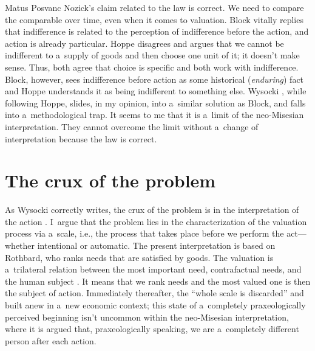 \begin{artengenv}{Matus Posvanc}
Nozick's claim related to the law is correct. We need to compare the comparable over time, even when it comes to valuation. Block 
\parencites*[][]{Block1980On}[][]{Block2009Rejoinder} %
 vitally replies that indifference is related to the perception of indifference before the action, and action is already particular. Hoppe 
\parencite*[][]{Hoppe2005Must} %
 disagrees and argues that we cannot be indifferent to a~supply of goods and then choose one unit of it; it doesn't make sense. Thus, both agree that choice is specific and both work with indifference. Block, however, sees indifference before action as some historical (\textit{enduring}) fact and Hoppe understands it as being indifferent to something else. Wysocki 
\parencite*[][]{Wysocki2021problem}, %
 while following Hoppe, slides, in my opinion, into a~similar solution as Block, and falls into a~methodological trap. It seems to me that it is a~limit of the neo-Misesian interpretation. They cannot overcome the limit without a~change of interpretation because the law is correct.



\section{The crux of the problem}



As Wysocki 
\parencite*[][footnote 30]{Wysocki2021problem} %
 correctly writes, the crux of the problem is in the interpretation of the action 
\parencite[see also][]{Hudik2011note}. %
 I~argue that the problem lies in the characterization of the valuation process via a~scale, i.e., the process that takes place before we perform the act---whether intentional or automatic. The present interpretation is based on Rothbard, 
\parencite*[][pp.5–6]{Rothbard2009Man_pos} %
 who ranks needs that are satisfied by goods. The valuation is a~trilateral relation between the most important need, contrafactual needs, and the human subject 
\parencite[][]{Bilo2004Theory}. %
 It means that we rank needs and the most valued one is then the subject of action. Immediately thereafter, the ``whole scale is discarded'' and built anew in a~new economic context; this state of a~completely praxeologically perceived beginning isn't uncommon within the neo-Misesian interpretation, where it is argued that, praxeologically speaking, we are a~completely different person after each action.




\end{artengenv}
